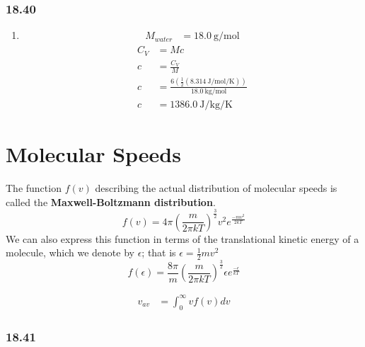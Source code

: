 \documentclass{article}
\begin{document}
\subsubsection{18.40}

\begin{enumerate}[label = \textbf{(\alph*)}]
	\item
		\begin{align*}
			M_{water} & = \SI{18.0}{\gram \per \mole}
		\end{align*}
		\begin{align*}
			C_{V} & = Mc \\
			c & = \frac{ C_{V} }{ M } \\
			c & = \frac{ 6 \left( \frac{1}{2} (\SI{8.314}{\joule \per \mole \per \kelvin}) \right) }{ \SI{18.0}{\kilogram \per \mole} } \\
			c & = \SI{1386.0}{\joule \per \kilogram \per \kelvin}
		\end{align*}
\end{enumerate}

\section{Molecular Speeds}

The function $ f(v) $ describing the actual distribution of molecular speeds is called the \textbf{Maxwell-Boltzmann distribution}.
\begin{equation}
	f(v) = 4\pi \left( \frac{ m }{ 2\pi kT } \right)^{\frac{ 3 }{ 2 }} v^2e^{ \frac{ -mv^2 }{ 2kT } }
\end{equation}
We can also express this function in terms of the translational kinetic energy of a molecule, which we denote by $ \epsilon $; that is $ \epsilon = \frac{1}{2}mv^2 $
\begin{equation}
	f(\epsilon) = \frac{ 8\pi }{ m } \left( \frac{ m }{ 2\pi kT } \right)^{\frac{ 3 }{ 2 }} \epsilon e^{ \frac{ -\epsilon }{ kT } }
\end{equation}

\begin{align*}
	v_{av} & = \int_0^\infty vf(v)dv
\end{align*}

\subsubsection{18.41}
\end{document}
